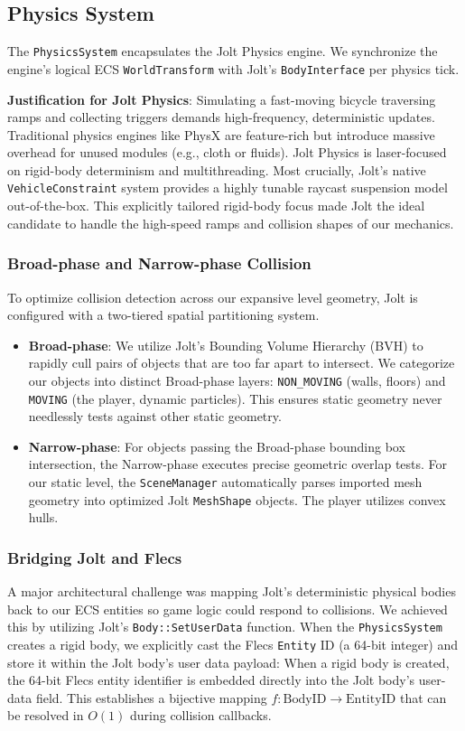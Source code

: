 \documentclass[acmtog, nonacm]{acmart}
\begin{document}
\subsection{Physics System}
The \texttt{PhysicsSystem} encapsulates the Jolt Physics engine. We synchronize the engine's logical ECS \texttt{WorldTransform} with Jolt's \texttt{BodyInterface} per physics tick.

\textbf{Justification for Jolt Physics}: Simulating a fast-moving bicycle traversing ramps and collecting triggers demands high-frequency, deterministic updates. Traditional physics engines like PhysX are feature-rich but introduce massive overhead for unused modules (e.g., cloth or fluids). Jolt Physics is laser-focused on rigid-body determinism and multithreading. Most crucially, Jolt's native \texttt{VehicleConstraint} system provides a highly tunable raycast suspension model out-of-the-box. This explicitly tailored rigid-body focus made Jolt the ideal candidate to handle the high-speed ramps and collision shapes of our mechanics.

\subsubsection{Broad-phase and Narrow-phase Collision}
To optimize collision detection across our expansive level geometry, Jolt is configured with a two-tiered spatial partitioning system. 
\begin{itemize}
    \item \textbf{Broad-phase}: We utilize Jolt's Bounding Volume Hierarchy (BVH) to rapidly cull pairs of objects that are too far apart to intersect. We categorize our objects into distinct Broad-phase layers: \texttt{NON\_MOVING} (walls, floors) and \texttt{MOVING} (the player, dynamic particles). This ensures static geometry never needlessly tests against other static geometry.
    \item \textbf{Narrow-phase}: For objects passing the Broad-phase bounding box intersection, the Narrow-phase executes precise geometric overlap tests. For our static level, the \texttt{SceneManager} automatically parses imported mesh geometry into optimized Jolt \texttt{MeshShape} objects. The player utilizes convex hulls.
\end{itemize}

\subsubsection{Bridging Jolt and Flecs}
A major architectural challenge was mapping Jolt's deterministic physical bodies back to our ECS entities so game logic could respond to collisions. We achieved this by utilizing Jolt's \texttt{Body::SetUserData} function. When the \texttt{PhysicsSystem} creates a rigid body, we explicitly cast the Flecs \texttt{Entity} ID (a 64-bit integer) and store it within the Jolt body's user data payload:
When a rigid body is created, the 64-bit Flecs entity identifier is embedded directly into the Jolt body's user-data field. This establishes a bijective mapping $f: \text{BodyID} \to \text{EntityID}$ that can be resolved in $O(1)$ during collision callbacks.
\end{document}
